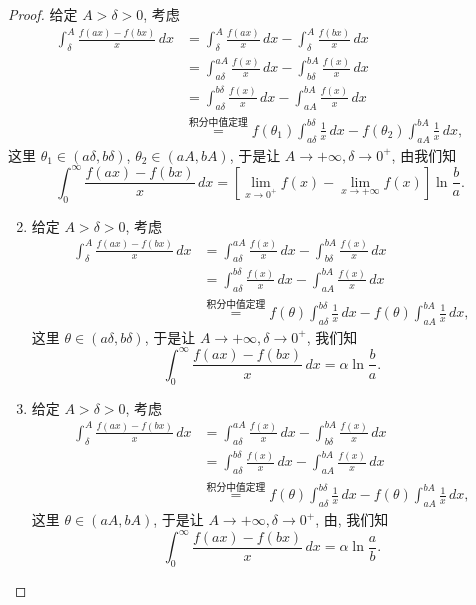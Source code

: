 \documentclass[lang=cn,10pt,thmcnt=section]{elegantbook}
\begin{document}
\begin{proof}
	
	给定 $A > \delta > 0$, 考虑
    \begin{align*}
        \int_{\delta}^{A} \frac{f(ax) - f(bx)}{x} \, dx 
        &= \int_{\delta}^{A} \frac{f(ax)}{x} \, dx - \int_{\delta}^{A} \frac{f(bx)}{x} \, dx \\
        &= \int_{a\delta}^{aA} \frac{f(x)}{x} \, dx - \int_{b\delta}^{bA} \frac{f(x)}{x} \, dx \\
        &= \int_{a\delta}^{b\delta} \frac{f(x)}{x} \, dx - \int_{aA}^{bA} \frac{f(x)}{x} \, dx \\
        &\overset{\text{积分中值定理}}{=} f(\theta_1)\int_{a\delta}^{b\delta} \frac{1}{x} \, dx - f(\theta_2)\int_{aA}^{bA} \frac{1}{x} \, dx,
    \end{align*}
    这里 $\theta_1 \in (a\delta, b\delta)$, $\theta_2 \in (aA, bA)$, 于是让 $A \to +\infty, \delta \to 0^+$, 由我们知
    \[
        \int_0^{\infty} \frac{f(ax) - f(bx)}{x} \, dx = \left[ \lim_{x \to 0^+} f(x) - \lim_{x \to +\infty} f(x) \right] \ln \frac{b}{a}.
    \]


	\begin{enumerate}
		\setcounter{enumi}{1} %
		
			\item 给定 $A > \delta > 0$, 考虑
			\begin{align*}
				\int_{\delta}^{A} \frac{f(ax) - f(bx)}{x} \, dx 
				&= \int_{a\delta}^{aA} \frac{f(x)}{x} \, dx - \int_{b\delta}^{bA} \frac{f(x)}{x} \, dx \\
				&= \int_{a\delta}^{b\delta} \frac{f(x)}{x} \, dx - \int_{aA}^{bA} \frac{f(x)}{x} \, dx \\
				&\overset{\text{积分中值定理}}{=} f(\theta) \int_{a\delta}^{b\delta} \frac{1}{x} \, dx - f(\theta) \int_{aA}^{bA} \frac{1}{x} \, dx,
			\end{align*}
			这里 $\theta \in (a\delta, b\delta)$, 于是让 $A \to +\infty, \delta \to 0^+$, 我们知
			\[
				\int_0^\infty \frac{f(ax) - f(bx)}{x} \, dx = \alpha \ln\frac{b}{a}.
			\]
		
			\item 给定 $A > \delta > 0$, 考虑
			\begin{align*}
				\int_{\delta}^{A} \frac{f(ax) - f(bx)}{x} \, dx 
				&= \int_{a\delta}^{aA} \frac{f(x)}{x} \, dx - \int_{b\delta}^{bA} \frac{f(x)}{x} \, dx \\
				&= \int_{a\delta}^{b\delta} \frac{f(x)}{x} \, dx - \int_{aA}^{bA} \frac{f(x)}{x} \, dx \\
				&\overset{\text{积分中值定理}}{=} f(\theta) \int_{a\delta}^{b\delta} \frac{1}{x} \, dx - f(\theta) \int_{aA}^{bA} \frac{1}{x} \, dx,
			\end{align*}
			这里 $\theta \in (aA, bA)$, 于是让 $A \to +\infty, \delta \to 0^+$, 由, 我们知
			\[
				\int_0^\infty \frac{f(ax) - f(bx)}{x} \, dx = \alpha \ln\frac{a}{b}.
			\]
		

\end{enumerate}
\end{proof}
\end{document}
